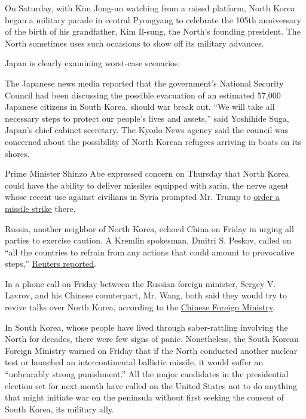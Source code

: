 On Saturday, with Kim Jong-un watching from a raised platform, North
Korea began a military parade in central Pyongyang to celebrate the
105th anniversary of the birth of his grandfather, Kim Il-sung, the
North's founding president. The North sometimes uses such occasions to
show off its military advances.

Japan is clearly examining worst-case scenarios.

The Japanese news media reported that the government's National Security
Council had been discussing the possible evacuation of an estimated
57,000 Japanese citizens in South Korea, should war break out. ``We will
take all necessary steps to protect our people's lives and assets,''
said Yoshihide Suga, Japan's chief cabinet secretary. The Kyodo News
agency said the council was concerned about the possibility of North
Korean refugees arriving in boats on its shores.

Prime Minister Shinzo Abe expressed concern on Thursday that North Korea
could have the ability to deliver missiles equipped with sarin, the
nerve agent whose recent use against civilians in Syria prompted Mr.
Trump to
\href{https://www.nytimes3xbfgragh.onion/2017/04/07/us/politics/syria-strike-trump-timeline.html}{order
a missile strike} there.

Russia, another neighbor of North Korea, echoed China on Friday in
urging all parties to exercise caution. A Kremlin spokesman, Dmitri S.
Peskov, called on ``all the countries to refrain from any actions that
could amount to provocative steps,''
\href{http://www.reuters.com/article/us-northkorea-russia-idUSKBN17G0RB}{Reuters
reported}.

In a phone call on Friday between the Russian foreign minister, Sergey
V. Lavrov, and his Chinese counterpart, Mr. Wang, both said they would
try to revive talks over North Korea, according to the
\href{http://www.mfa.gov.cn/web/zyxw/t1453861.shtml}{Chinese Foreign
Ministry}.

In South Korea, whose people have lived through saber-rattling involving
the North for decades, there were few signs of panic. Nonetheless, the
South Korean Foreign Ministry warned on Friday that if the North
conducted another nuclear test or launched an intercontinental ballistic
missile, it would suffer an ``unbearably strong punishment.'' All the
major candidates in the presidential election set for next month have
called on the United States not to do anything that might initiate war
on the peninsula without first seeking the consent of South Korea, its
military ally.

